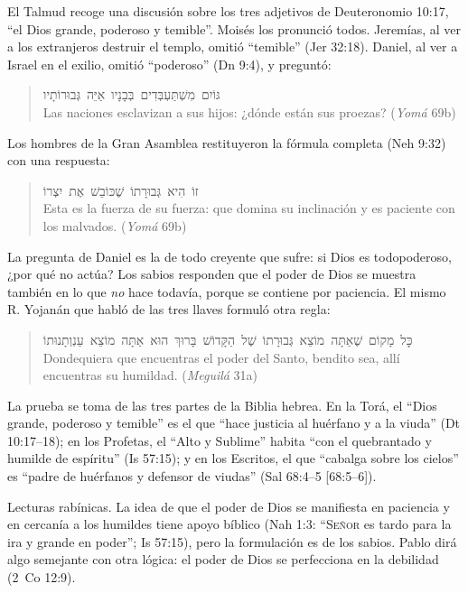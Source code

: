 \documentclass[11pt,letterpaper]{article}
\newcommand{\heb}[1]{\mbox{\foreignlanguage{hebrew}{#1}}}
\newcommand{\SENOR}{\textsc{Señor}}
\begin{document}
El Talmud recoge una discusión sobre los tres adjetivos de Deuteronomio 10:17, ``el Dios grande, poderoso y temible''. Moisés los pronunció todos. Jeremías, al ver a los extranjeros destruir el templo, omitió ``temible'' (Jer 32:18). Daniel, al ver a Israel en el exilio, omitió ``poderoso'' (Dn 9:4), y preguntó:

\begin{quote}\small
\heb{גּוֹיִם מִשְׁתַּעְבְּדִים בְּבָנָיו אַיֵּה גְּבוּרוֹתָיו}\\
Las naciones esclavizan a sus hijos: ¿dónde están sus proezas? (\emph{Yomá} 69b)
\end{quote}

Los hombres de la Gran Asamblea restituyeron la fórmula completa (Neh 9:32) con una respuesta:

\begin{quote}\small
\heb{זוֹ הִיא גְּבוּרָתוֹ שֶׁכּוֹבֵשׁ אֶת יִצְרוֹ}\\
Esta es la fuerza de su fuerza: que domina su inclinación y es paciente con los malvados. (\emph{Yomá} 69b)
\end{quote}

La pregunta de Daniel es la de todo creyente que sufre: si Dios es todopoderoso, ¿por qué no actúa? Los sabios responden que el poder de Dios se muestra también en lo que \emph{no} hace todavía, porque se contiene por paciencia. El mismo R. Yojanán que habló de las tres llaves formuló otra regla:

\begin{quote}\small
\heb{כׇּל מָקוֹם שֶׁאַתָּה מוֹצֵא גְּבוּרָתוֹ שֶׁל הַקָּדוֹשׁ בָּרוּךְ הוּא אַתָּה מוֹצֵא עַנְוְתָנוּתוֹ}\\
Dondequiera que encuentras el poder del Santo, bendito sea, allí encuentras su humildad. (\emph{Meguilá} 31a)
\end{quote}

La prueba se toma de las tres partes de la Biblia hebrea. En la Torá, el ``Dios grande, poderoso y temible'' es el que ``hace justicia al huérfano y a la viuda'' (Dt 10:17--18); en los Profetas, el ``Alto y Sublime'' habita ``con el quebrantado y humilde de espíritu'' (Is 57:15); y en los Escritos, el que ``cabalga sobre los cielos'' es ``padre de huérfanos y defensor de viudas'' (Sal 68:4--5 [68:5--6]).

\begin{nota}[Precisión]
Lecturas rabínicas. La idea de que el poder de Dios se manifiesta en paciencia y en cercanía a los humildes tiene apoyo bíblico (Nah 1:3: ``\SENOR{} es tardo para la ira y grande en poder''; Is 57:15), pero la formulación es de los sabios. Pablo dirá algo semejante con otra lógica: el poder de Dios se perfecciona en la debilidad (2~Co 12:9).
\end{nota}
\end{document}

